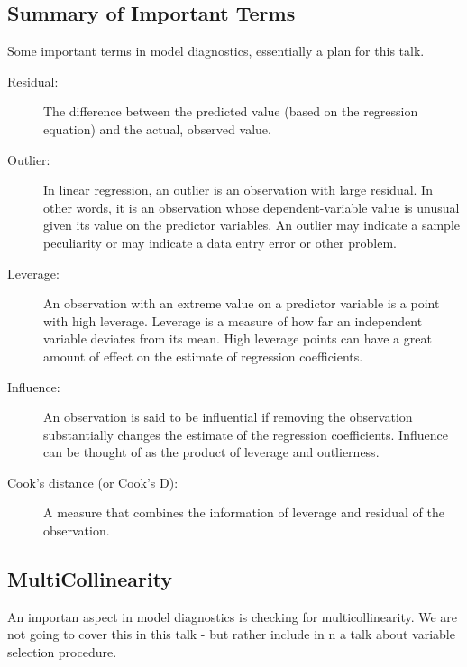 \documentclass[residuals.tex]{subfiles}
\begin{document}
\bigskip
\subsection*{Summary of Important Terms}
Some important terms in model diagnostics, essentially a plan for this talk.
\begin{description}
	\item[Residual: ] The difference between the predicted value (based on the regression equation) and the actual, observed value.
	\item[Outlier:]  In linear regression, an outlier is an observation with large residual.  In other words, it is an observation whose dependent-variable value is unusual given its value on the predictor variables.  An outlier may indicate a sample peculiarity or may indicate a data entry error or other problem. 
	\item[Leverage:]  An observation with an extreme value on a predictor variable is a point with high leverage.  Leverage is a measure of how far an independent variable deviates from its mean.  High leverage points can have a great amount of effect on the estimate of regression coefficients. 
	\item[Influence:]  An observation is said to be influential if removing the observation substantially changes the estimate of the regression coefficients.  Influence can be thought of as the product of leverage and outlierness.  
	\item[Cook's distance (or Cook's D):] A measure that combines the information of leverage and residual of the observation.  
\end{description}

\subsection*{MultiCollinearity}

An importan aspect in model diagnostics is checking for multicollinearity. We are not going to cover this in this talk - but rather include in n a talk about variable selection procedure.
\bigskip
\end{document}

